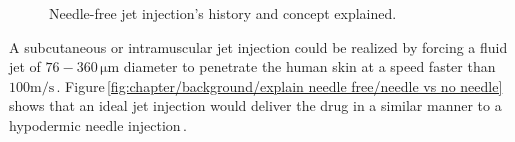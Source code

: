         \begin{figure}[!ht]
            \centering
            \qquad
            \caption{
                Needle-free jet injection's history and concept explained.
            }   \label{fig:chapter/background/explain needle free}
        \end{figure}
        
        A subcutaneous or intramuscular jet injection could be realized by forcing a fluid jet of $\mathrm{76-360\,\mu m}$  diameter to penetrate the human skin at a speed faster than $\mathrm{100 m/s}$\,\cite{mitragotri2006,Hogan2006}. Figure\,\ref{fig:chapter/background/explain needle free/needle vs no needle} shows that an ideal jet injection would deliver the drug in a similar manner to a hypodermic needle injection\,\cite{InsuJet2013}.
        
        
